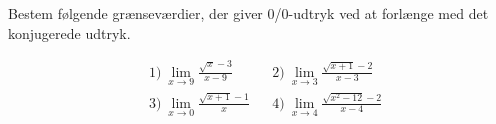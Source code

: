 Bestem følgende grænseværdier, der giver 0/0-udtryk ved at forlænge med det konjugerede udtryk. 

\begin{align*}
	&1) \ \lim_{x \to 9} \frac{\sqrt{x}-3}{x-9}    & &2) \ \lim_{x\to 3}\frac{\sqrt{x+1} - 2}{x-3}  \\
	&3) \ \lim_{x \to 0} \frac{\sqrt{x + 1} - 1}{x}  & &4) \ \lim_{x \to 4} \frac{\sqrt{x^2 -12}-2}{x-4}  \\
\end{align*}

\newpage